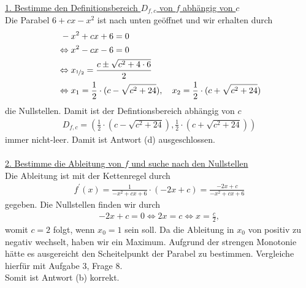 \underline{1. Bestimme den Definitionsbereich $D_{f,c}$ von $f$ abhängig von $c$}\\
Die Parabel $6 + cx -x^2$ ist nach unten geöffnet und wir erhalten durch
\begin{align*}
&\  -x^2 + cx +6 = 0 \\
&\Leftrightarrow
x^2 -cx - 6 = 0\\
&\Leftrightarrow
x_{\nicefrac{1}{2}}
= \frac{c \pm \sqrt{c^2 + 4 \cdot 6}}{2}\\
&\Leftrightarrow
x_1 = \frac{1}{2} \cdot ( c - \sqrt{c^2 +24}),
\quad 
x_2 = \frac{1}{2} \cdot ( c + \sqrt{c^2 +24})
\end{align*}
die Nullstellen. Damit ist der Defintionsbereich abhängig von $c$
\begin{align*}
D_{f,c} = \left( \frac{1}{2} \cdot ( c - \sqrt{c^2 +24}), \frac{1}{2} \cdot ( c + \sqrt{c^2 +24}) \right)
\end{align*}
immer nicht-leer. Damit ist Antwort (d) ausgeschlossen.\\
\\
\underline{2. Bestimme die Ableitung von $f$ und suche nach den Nullstellen}\\
Die Ableitung ist mit der Kettenregel durch 
\begin{align*}
f^\prime(x) = \frac{1}{-x^2 + cx +6} \cdot ( -2x+ c)
= \frac{-2x + c}{-x^2 + cx +6}
\end{align*}
gegeben. Die Nullstellen finden wir durch
\begin{align*}
-2x + c = 0 
\Leftrightarrow
2x = c
\Leftrightarrow
x = \frac{c}{2},
\end{align*}
womit $c = 2 $ folgt, wenn $x_0 = 1 $ sein soll.
Da die Ableitung in $x_0$ von positiv zu negativ wechselt, haben wir ein Maximum.
Aufgrund der strengen Monotonie hätte es ausgereicht den Scheitelpunkt der Parabel zu bestimmen.
Vergleiche hierfür mit Aufgabe 3, Frage 8.\\

Somit ist Antwort (b) korrekt.
\newpage


